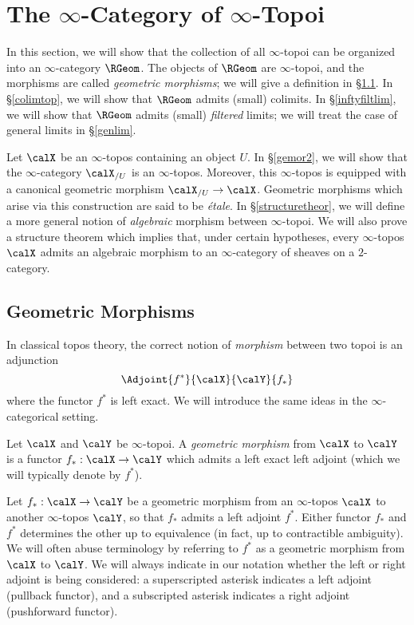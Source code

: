 \section{The $\infty$-Category of $\infty$-Topoi}\label{chap6sec4}
\setcounter{theorem}{0}

In this section, we will show that the collection of all $\infty$-topoi can be organized into an $\infty$-category $\RGeom$. The objects of $\RGeom$ are $\infty$-topoi, and the morphisms are called {\it geometric morphisms}; we will give a definition in \S \ref{gemor1}. In \S \ref{colimtop}, we will show that $\RGeom$ admits (small) colimits. In \S \ref{inftyfiltlim}, we will show that $\RGeom$ admits 
(small) {\em filtered} limits; we will treat the case of general limits in \S \ref{genlim}.

Let $\calX$ be an $\infty$-topos containing an object $U$. In \S \ref{gemor2}, we will show that the 
$\infty$-category $\calX_{/U}$ is an $\infty$-topos. Moreover, this $\infty$-topos is equipped with
a canonical geometric morphism $\calX_{/U} \rightarrow \calX$. Geometric morphisms which arise via this construction are said to be {\em \'{e}tale}. In \S \ref{structuretheor}, we will define a more general notion of {\em algebraic} morphism between $\infty$-topoi. We will also prove a structure theorem which implies that, under certain hypotheses, every $\infty$-topos $\calX$ admits an algebraic morphism to an $\infty$-category of sheaves on a $2$-category.

\subsection{Geometric Morphisms}\label{gemor1}

In classical topos theory, the correct notion of {\em morphism} between two topoi is an adjunction
$$ \Adjoint{f^{\ast}}{\calX}{\calY}{f_{\ast}}$$
where the functor $f^{\ast}$ is left exact. We will introduce the same ideas in the $\infty$-categorical setting.

\begin{definition}\label{geomorph}
Let $\calX$ and $\calY$ be $\infty$-topoi.
A {\it geometric morphism} from $\calX$ to $\calY$ is a functor
$f_{\ast}: \calX \rightarrow \calY$ which admits a left exact left adjoint (which we will typically denote by $f^{\ast}$).
\end{definition}

\begin{remark}
Let $f_{\ast}: \calX \rightarrow \calY$ be a geometric morphism from an $\infty$-topos $\calX$ to another $\infty$-topos $\calY$, so that $f_{\ast}$ admits a left adjoint $f^{\ast}$. 
Either functor $f_{\ast}$ and $f^{\ast}$ determines the other up to equivalence (in fact, up to contractible ambiguity). We will often abuse terminology by referring to $f^{\ast}$ as a geometric morphism from $\calX$ to $\calY$. We will always indicate in our notation whether the left or right adjoint is being considered: a superscripted asterisk indicates a left adjoint (pullback functor), and a subscripted asterisk indicates a right adjoint (pushforward functor).
\end{remark}

